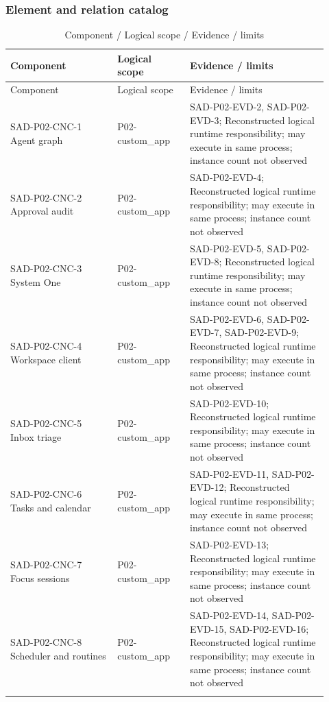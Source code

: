 \documentclass[10pt,letterpaper]{article}
\begin{document}
\subsubsection{Element and relation catalog}
\begin{longtable}{@{}>{\raggedright\arraybackslash}p{0.31\linewidth}>{\raggedright\arraybackslash}p{0.21\linewidth}>{\raggedright\arraybackslash}p{0.4\linewidth}@{}}
\caption{Component / Logical scope / Evidence / limits}\\
\toprule Component & Logical scope & Evidence / limits\\\midrule\endfirsthead
\toprule Component & Logical scope & Evidence / limits\\\midrule\endhead
SAD-P02-CNC-1 Agent graph & P02-custom\_app & SAD-P02-EVD-2, SAD-P02-EVD-3; Reconstructed logical runtime responsibility; may execute in same process; instance count not observed\\\addlinespace
SAD-P02-CNC-2 Approval audit & P02-custom\_app & SAD-P02-EVD-4; Reconstructed logical runtime responsibility; may execute in same process; instance count not observed\\\addlinespace
SAD-P02-CNC-3 System One & P02-custom\_app & SAD-P02-EVD-5, SAD-P02-EVD-8; Reconstructed logical runtime responsibility; may execute in same process; instance count not observed\\\addlinespace
SAD-P02-CNC-4 Workspace client & P02-custom\_app & SAD-P02-EVD-6, SAD-P02-EVD-7, SAD-P02-EVD-9; Reconstructed logical runtime responsibility; may execute in same process; instance count not observed\\\addlinespace
SAD-P02-CNC-5 Inbox triage & P02-custom\_app & SAD-P02-EVD-10; Reconstructed logical runtime responsibility; may execute in same process; instance count not observed\\\addlinespace
SAD-P02-CNC-6 Tasks and calendar & P02-custom\_app & SAD-P02-EVD-11, SAD-P02-EVD-12; Reconstructed logical runtime responsibility; may execute in same process; instance count not observed\\\addlinespace
SAD-P02-CNC-7 Focus sessions & P02-custom\_app & SAD-P02-EVD-13; Reconstructed logical runtime responsibility; may execute in same process; instance count not observed\\\addlinespace
SAD-P02-CNC-8 Scheduler and routines & P02-custom\_app & SAD-P02-EVD-14, SAD-P02-EVD-15, SAD-P02-EVD-16; Reconstructed logical runtime responsibility; may execute in same process; instance count not observed\\\addlinespace

\end{longtable}
\end{document}
